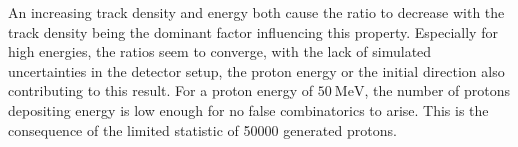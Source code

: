 An increasing track density and energy both cause the ratio to decrease with the track density being the dominant factor influencing this property. Especially for high energies,
the ratios seem to converge, with the lack of simulated uncertainties in the detector setup, the proton energy or the initial direction also contributing to this result.
For a proton energy of $\SI{50}{\mega\eV}$, the number of protons depositing energy is low enough for no false combinatorics to arise. This is the consequence of the
limited statistic of 50000 generated protons.

